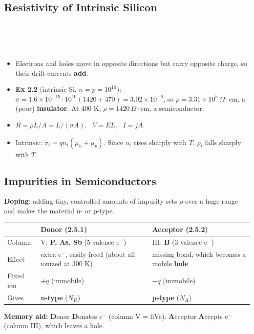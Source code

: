     \subsection[2.4]{Resistivity of Intrinsic Silicon}
    \\
    \\
    \
    \begin{itemize}
        \item Electrons and holes move in opposite directions but carry opposite charge, so their drift currents \textbf{add}.
        \item \textbf{Ex 2.2} (intrinsic Si, $n = p = 10^{10}$): $\sigma = 1.6\times10^{-19}\cdot10^{10}(1420 + 470) = 3.02\times10^{-6}$, so $\rho = 3.31\times10^5\ \Omega\cdot$cm, a (poor) \textbf{insulator}. At 400 K, $\rho = 1420\ \Omega\cdot$cm, a semiconductor. 
    \end{itemize}

    \begin{handy}
        \begin{itemize}
            \item $R = \rho L/A = L/(\sigma A)$. \ $V = EL$, \ $I = jA$.
            \item Intrinsic: $\sigma_i = qn_i(\mu_n + \mu_p)$. Since $n_i$ rises sharply with $T$, $\rho_i$ falls sharply with $T$.
        \end{itemize}
    \end{handy}

    \subsection[2.5]{Impurities in Semiconductors}
    \textbf{Doping}: adding tiny, controlled amounts of impurity sets $\rho$ over a huge range and makes the material n- or p-type.\\
    \begin{tabularx}{\linewidth}{|l|L|L|}
        \hline
        & \textbf{Donor} (2.5.1) & \textbf{Acceptor} (2.5.2) \\ \hline
        Column & V: \textbf{P, As, Sb} (5 valence e$^-$) & III: \textbf{B} (3 valence e$^-$) \\ \hline
        Effect & extra e$^-$, easily freed (about all ionized at 300 K) & missing bond, which becomes a mobile \textbf{hole} \\ \hline
        Fixed ion & $+q$ (immobile) & $-q$ (immobile) \\ \hline
        Gives & \textbf{n-type} ($N_D$) & \textbf{p-type} ($N_A$) \\ \hline
    \end{tabularx}
    \textbf{Memory aid:} \textbf{D}onor \textbf{D}onates e$^-$ (column V = fiVe). \textbf{A}cceptor \textbf{A}ccepts e$^-$ (column III), which leaves a hole.

